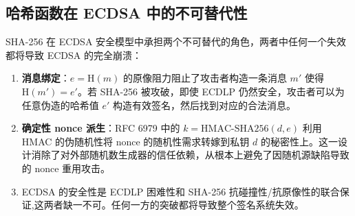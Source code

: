 \documentclass[a4paper,12pt]{ctexart}
\begin{document}
\subsection{哈希函数在 ECDSA 中的不可替代性}

SHA-256 在 ECDSA 安全模型中承担两个不可替代的角色，两者中任何一个失效都将导致 ECDSA 的完全崩溃：

\begin{enumerate}[leftmargin=*]
  \item \textbf{消息绑定}：$e = \text{H}(m)$ 的原像阻力阻止了攻击者构造一条消息 $m'$ 使得 $\text{H}(m') = e'$。若 SHA-256 被攻破，即使 ECDLP 仍然安全，攻击者可以为任意伪造的哈希值 $e'$ 构造有效签名，然后找到对应的合法消息。

  \item \textbf{确定性 nonce 派生}：RFC 6979 中的 $k = \text{HMAC-SHA256}(d, e)$ 利用 HMAC 的伪随机性将 nonce 的随机性需求转嫁到私钥 $d$ 的秘密性上。这一设计消除了对外部随机数生成器的信任依赖，从根本上避免了因随机源缺陷导致的 nonce 重用攻击。
 
  \item ECDSA 的安全性是 ECDLP 困难性和 SHA-256 抗碰撞性/抗原像性的联合保证,这两者缺一不可。任何一方的突破都将导致整个签名系统失效。
\end{enumerate}
\end{document}
